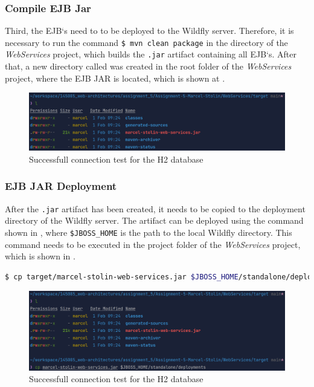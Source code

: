 \subsubsection{Compile EJB Jar}\label{sec:03_depl_wildfly_jar}
Third, the EJB`s need to to be deployed to the Wildfly server. Therefore, it is necessary to run the command \texttt{\$ mvn clean package} in the directory of the \textit{WebServices} project, which builds the \texttt{.jar} artifact containing all EJB`s. After that, a new directory called  was created in the root folder of the \textit{WebServices} project, where the EJB JAR  is located, which is shown at .
\begin{figure}[h]
\centering
\includegraphics[scale=0.2]{images/03_depl/web-services-artifact}
\caption{Successfull connection test for the H2 database}
\label{fig:03_depl_wildfly_jar_build}
\end{figure}


\subsubsection{EJB JAR Deployment}\label{sec:03_depl_wildfly_deploy}
After the \texttt{.jar} artifact has been created, it needs to be copied to the deployment directory of the Wildfly server. The artifact can be deployed using the command shown in , where \texttt{\$JBOSS\_HOME} is the path to the local Wildfly directory. This command needs to be executed in the project folder of the \textit{WebServices} project, which is shown in .
\begin{lstlisting}[label=lst:03_depl_wildfly_deploy_command, caption=Default data source configuration, language=sh]
$ cp target/marcel-stolin-web-services.jar $JBOSS_HOME/standalone/deployments
\end{lstlisting}
\begin{figure}[h]
\centering
\includegraphics[scale=0.2]{images/03_depl/web-services-deployment}
\caption{Successfull connection test for the H2 database}
\label{fig:03_depl_wildfly_deploy_command}
\end{figure}


